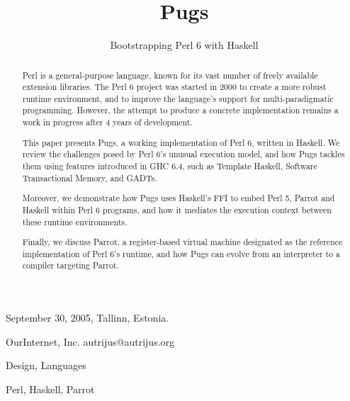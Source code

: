 \documentclass[]{sigplanconf}
\begin{document}
 {September 30, 2005, Tallinn, Estonia.}




\title{Pugs}
\subtitle{Bootstrapping Perl 6 with Haskell}
           {OurInternet, Inc.}
           {autrijus@autrijus.org}
\maketitle

\begin{abstract}
  
Perl is a general-purpose language, known for its vast number of freely
available extension libraries.  The Perl 6 project was started in 2000
to create a more robust runtime environment, and to improve the language's
support for multi-paradigmatic programming.  However, the attempt to produce a
concrete implementation remains a work in progress after 4 years of development.

This paper presents Pugs, a working implementation of Perl 6, written in
Haskell.  We review the challenges posed by Perl 6's unusual execution model,
and how Pugs tackles them using features introduced in GHC 6.4, such as
Template Haskell, Software Transactional Memory, and GADTs.

Moreover, we demonstrate how Pugs uses Haskell's FFI to embed Perl 5, Parrot
and Haskell within Perl 6 programs, and how it mediates the execution context
between these runtime environments.

Finally, we discuss Parrot, a register-based virtual machine designated as the
reference implementation of Perl 6's runtime, and how Pugs can evolve from an
interpreter to a compiler targeting Parrot.

\end{abstract}


\terms{}

Design, Languages

\keywords{}

Perl, Haskell, Parrot

\end{document}
